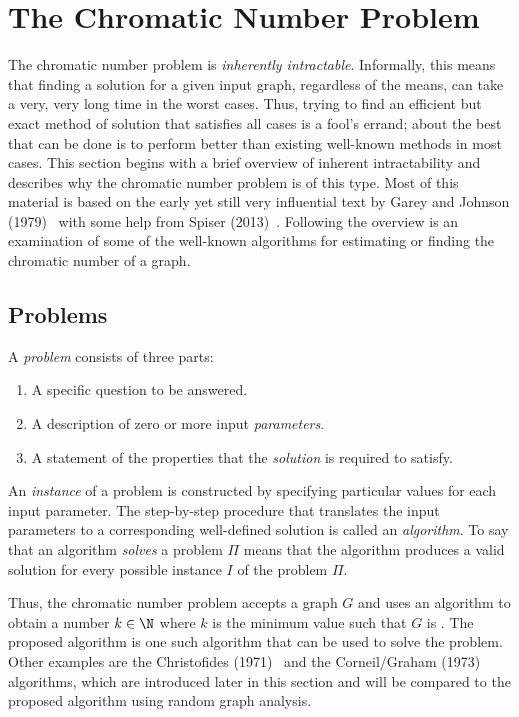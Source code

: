 \section{The Chromatic Number Problem}\label{sec:chromatic}

The chromatic number problem is \emph{inherently intractable}.  Informally, this means that finding a solution for
a given input graph, regardless of the means, can take a very, very long time in the worst cases.  Thus, trying to
find an efficient but exact method of solution that satisfies all cases is a fool's errand; about the best that can
be done is to perform better than existing well-known methods in most cases.  This section begins with a brief
overview of inherent intractability and describes why the chromatic number problem is of this type.  Most of this
material is based on the early yet still very influential text by Garey and Johnson (1979)~\cite{garey} with some
help from Spiser (2013)~\cite{sipser}.  Following the overview is an examination of some of the well-known
algorithms for estimating or finding the chromatic number of a graph.

\subsection{Problems}\label{sec:sub:problems}

A \emph{problem} consists of three parts:

\begin{enumerate}
\item A specific question to be answered.
\item A description of zero or more input \emph{parameters}.
\item A statement of the properties that the \emph{solution} is required to satisfy.
\end{enumerate}

An \emph{instance} of a problem is constructed by specifying particular values for each input parameter.  The
step-by-step procedure that translates the input parameters to a corresponding well-defined solution is called an
\emph{algorithm}.  To say that an algorithm \emph{solves} a problem \(\Pi\) means that the algorithm produces a
valid solution for every possible instance \(I\) of the problem \(\Pi\).

Thus, the chromatic number problem accepts a graph \(G\) and uses an algorithm to obtain a number \(k\in\N\) where
\(k\) is the minimum value such that \(G\) is .  The proposed algorithm is one such algorithm that can
be used to solve the problem.  Other examples are the Christofides (1971)~\cite{christofides} and the Corneil/Graham
(1973)~\cite{corneil} algorithms, which are introduced later in this section and will be compared to the proposed
algorithm using random graph analysis.

